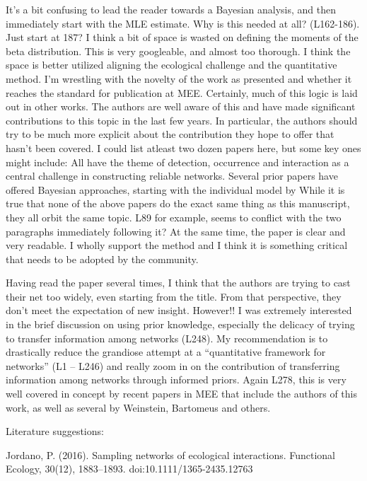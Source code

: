 \documentclass[12pt]{letter}
\begin{document}
	It’s a bit confusing to lead the reader towards a Bayesian analysis, and then immediately start with the MLE estimate. Why is this needed at all? (L162-186). Just start at 187?
	I think a bit of space is wasted on defining the moments of the beta distribution. This is very googleable, and almost too thorough. I think the space is better utilized aligning the ecological challenge and the quantitative method.
	I’m wrestling with the novelty of the work as presented and whether it reaches the standard for publication at MEE. Certainly, much of this logic is laid out in other works. The authors are well aware of this and have made significant contributions to this topic in the last few years. In particular, the authors should try to be much more explicit about the contribution they hope to offer that hasn’t been covered. I could list atleast two dozen papers here, but some key ones might include:
	All have the theme of detection, occurrence and interaction as a central challenge in constructing
	reliable networks. Several prior papers have offered Bayesian approaches, starting with the individual model by
	While it is true that none of the above papers do the exact same thing as this manuscript, they all
	orbit the same topic. L89 for example, seems to conflict with the two paragraphs immediately following it?
	At the same time, the paper is clear and very readable. I wholly support the method and I think it is something critical that needs to be adopted by the community.

	Having read the paper several times, I think that the authors are trying to cast their net too widely, even starting from the title. From that perspective, they don’t meet the expectation of new insight. However!! I was extremely interested in the brief discussion on using prior knowledge, especially the delicacy of trying to transfer information among networks (L248). My recommendation is to drastically reduce the grandiose attempt at a “quantitative framework for networks” (L1 – L246) and really zoom in on the contribution of transferring information among networks through informed priors.
	Again L278, this is very well covered in concept by recent papers in MEE that include the authors of this work, as well as several by Weinstein, Bartomeus and others.


		Literature suggestions:


	Jordano, P. (2016). Sampling networks of ecological interactions. Functional Ecology, 30(12), 1883–1893. doi:10.1111/1365-2435.12763
\end{document}
